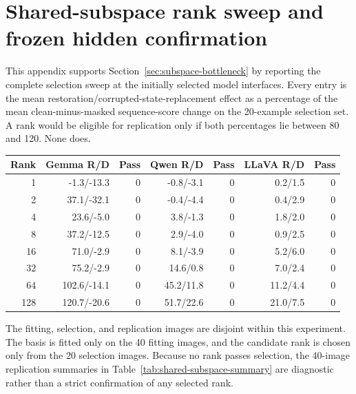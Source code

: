 \section{Shared-subspace rank sweep and frozen hidden confirmation}
\label{app:shared-subspace-details}

This appendix supports Section~\ref{sec:subspace-bottleneck} by reporting the complete selection sweep at the initially selected model interfaces. Every entry is the mean restoration/corrupted-state-replacement effect as a percentage of the mean clean-minus-masked sequence-score change on the 20-example selection set. A rank would be eligible for replication only if both percentages lie between 80 and 120. None does.

\begin{center}
\captionsetup{type=table,hypcap=false}
\centering
\small
\setlength{\tabcolsep}{2.2pt}
\caption{\textbf{Complete example-shared subspace selection sweep.} Each model fits its own basis. Every cell is restoration/corrupted-state-replacement retention in percent, and Pass is 1 only when both values lie in the predeclared 80--120 interval.}
\label{tab:shared-subspace-rank-sweep}
\begin{tabular*}{\linewidth}{@{\extracolsep{\fill}}rrrrrrr@{}}
\toprule
Rank & Gemma R/D & Pass & Qwen R/D & Pass & LLaVA R/D & Pass \\
\midrule
1   & -1.3/-13.3  & 0 & -0.8/-3.1 & 0 & 0.2/1.5  & 0 \\
2   & 37.1/-32.1  & 0 & -0.4/-4.4 & 0 & 0.4/2.9  & 0 \\
4   & 23.6/-5.0   & 0 & 3.8/-1.3  & 0 & 1.8/2.0  & 0 \\
8   & 37.2/-12.5  & 0 & 2.9/-4.0  & 0 & 0.9/2.5  & 0 \\
16  & 71.0/-2.9   & 0 & 8.1/-3.9  & 0 & 5.2/6.0  & 0 \\
32  & 75.2/-2.9   & 0 & 14.6/0.8  & 0 & 7.0/2.4  & 0 \\
64  & 102.6/-14.1 & 0 & 45.2/11.8 & 0 & 11.2/4.4 & 0 \\
128 & 120.7/-20.6 & 0 & 51.7/22.6 & 0 & 21.0/7.5 & 0 \\
\bottomrule
\end{tabular*}
\end{center}

The fitting, selection, and replication images are disjoint within this experiment. The basis is fitted only on the 40 fitting images, and the candidate rank is chosen only from the 20 selection images. Because no rank passes selection, the 40-image replication summaries in Table~\ref{tab:shared-subspace-summary} are diagnostic rather than a strict confirmation of any selected rank.

